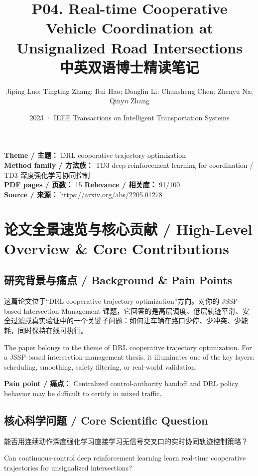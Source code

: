 \documentclass[UTF8,a4paper,11pt,fontset=fandol]{ctexart}
\title{P04. Real-time Cooperative Vehicle Coordination at Unsignalized Road Intersections\\中英双语博士精读笔记}
\author{Jiping Luo; Tingting Zhang; Rui Hao; Donglin Li; Chunsheng Chen; Zhenyu Na; Qinyu Zhang}
\date{2023 · IEEE Transactions on Intelligent Transportation Systems}
\begin{document}
\maketitle

\noindent\textbf{Theme / 主题：} DRL cooperative trajectory optimization\\
\textbf{Method family / 方法族：} TD3 deep reinforcement learning for coordination / TD3 深度强化学习协同控制\\
\textbf{PDF pages / 页数：} 15 \quad
\textbf{Relevance / 相关度：} 91/100\\
\textbf{Source / 来源：} \url{https://arxiv.org/abs/2205.01278}

\section{论文全景速览与核心贡献 / High-Level Overview \& Core Contributions}
\subsection{研究背景与痛点 / Background \& Pain Points}
这篇论文位于“DRL cooperative trajectory optimization”方向。对你的 JSSP-based Intersection Management 课题，它回答的是高层调度、低层轨迹平滑、安全过滤或真实验证中的一个关键子问题：如何让车辆在路口少停、少冲突、少能耗，同时保持在线可执行。

The paper belongs to the theme of DRL cooperative trajectory optimization. For a JSSP-based intersection-management thesis, it illuminates one of the key layers: scheduling, smoothing, safety filtering, or real-world validation.

\textbf{Pain point / 痛点：} Centralized control-authority handoff and DRL policy behavior may be difficult to certify in mixed traffic.

\subsection{核心科学问题 / Core Scientific Question}
能否用连续动作深度强化学习直接学习无信号交叉口的实时协同轨迹控制策略？

Can continuous-control deep reinforcement learning learn real-time cooperative trajectories for unsignalized intersections?
\end{document}
